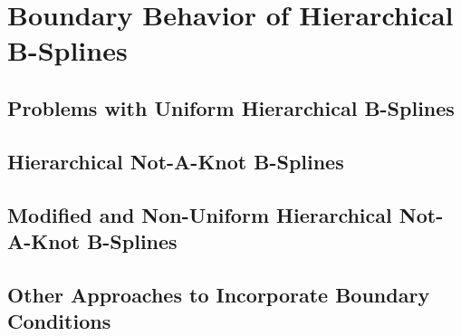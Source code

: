 \section{Boundary Behavior of Hierarchical B-Splines}
\label{sec:23boundary}


\blindtext{}



\subsection{Problems with Uniform Hierarchical B-Splines}


\blindtext{}



\subsection{Hierarchical Not-A-Knot B-Splines}


\blindtext{}



\subsection{Modified and Non-Uniform Hierarchical Not-A-Knot B-Splines}


\blindtext{}



\subsection{Other Approaches to Incorporate Boundary Conditions}


\blindtext{}
